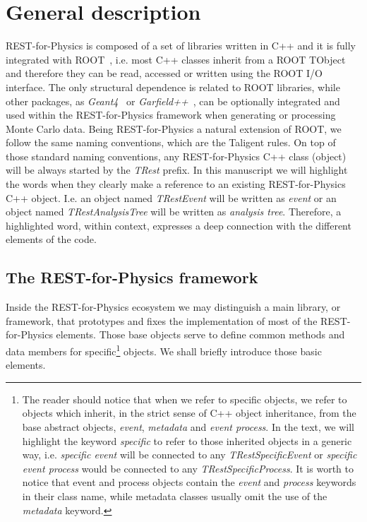 \section{General description}
\label{sec:framework}



REST-for-Physics is composed of a set of libraries written in C++ and it is fully integrated with ROOT~\cite{ROOT,Brun:2011Gp,ROOT2011}, i.e. most C++ classes inherit from a ROOT TObject and therefore they can be read, accessed or written using the ROOT I/O interface. The only structural dependence is related to ROOT libraries, while other packages, as \emph{Geant4}~\cite{Agostinelli:2002hh} or \emph{Garfield++}~\cite{Garfield}, can be optionally integrated and used within the REST-for-Physics framework when generating or processing Monte Carlo data. Being REST-for-Physics a natural extension of ROOT, we follow the same naming conventions, which are the Taligent rules. On top of those standard naming conventions, any REST-for-Physics C++ class (object) will be always started by the \emph{TRest} prefix. In this manuscript we will highlight the words when they clearly make a reference to an existing REST-for-Physics C++ object. I.e. an object named \emph{TRestEvent} will be written as \emph{event} or an object named \emph{TRestAnalysisTree} will be written as \emph{analysis tree}. Therefore, a highlighted word, within context, expresses a deep connection with the different elements of the code.

\subsection{The REST-for-Physics framework}
Inside the REST-for-Physics ecosystem we may distinguish a main library, or framework, that prototypes and fixes the implementation of most of the REST-for-Physics elements. Those base objects serve to define common methods and data members for specific\footnote{The reader should notice that when we refer to specific objects, we refer to objects which inherit, in the strict sense of C++ object inheritance, from the base abstract objects, \emph{event}, \emph{metadata} and \emph{event process}. In the text, we will highlight the keyword \emph{specific} to refer to those inherited objects in a generic way, i.e. \emph{specific event} will be connected to any \emph{TRestSpecificEvent} or \emph{specific event process} would be connected to any \emph{TRestSpecificProcess}. It is worth to notice that event and process objects contain the \emph{event} and \emph{process} keywords in their class name, while metadata classes usually omit the use of the \emph{metadata} keyword. } objects. We shall briefly introduce those basic elements.


